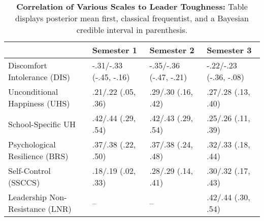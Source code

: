 \begin{table}[ht]
\centering
\begin{tabular}{llll}
  \hline
 & Semester 1 & Semester 2 & Semester 3 \\ 
  \hline
Discomfort Intolerance (DIS) & -.31/-.33 (-.45, -.16) & -.35/-.36 (-.47, -.21) & -.22/-.23 (-.36, -.08) \\ 
  Unconditional Happiness (UHS) & .21/.22 (.05, .36) & .29/.30 (.16, .42) & .27/.28 (.13, .40) \\ 
  School-Specific UH & .42/.44 (.29, .54) & .42/.43 (.29, .54) & .25/.26 (.11, .39) \\ 
  Psychological Resilience (BRS) & .37/.38 (.22, .50) & .37/.38 (.24, .48) & .32/.33 (.18, .44) \\ 
  Self-Control (SSCCS) & .18/.19 (.02, .33) & .28/.29 (.14, .41) & .30/.32 (.17, .43) \\ 
  Leadership Non-Resistance (LNR) & -- & -- & .42/.44 (.30, .54) \\ 
   \hline
\end{tabular}
\caption{\textbf{Correlation of Various Scales to Leader Toughness:} Table displays posterior mean first, classical frequentist, and a Bayesian credible interval in parenthesis.} 
\label{tab:edc_corr}
\end{table}
